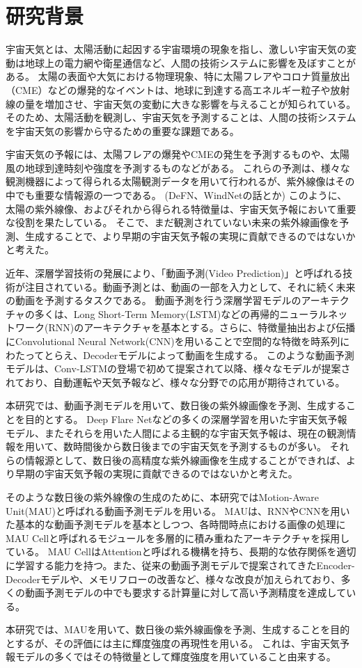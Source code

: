 \chapter{研究背景}

宇宙天気とは、太陽活動に起因する宇宙環境の現象を指し、激しい宇宙天気の変動は地球上の電力網や衛星通信など、人間の技術システムに影響を及ぼすことがある。
太陽の表面や大気における物理現象、特に太陽フレアやコロナ質量放出（CME）などの爆発的なイベントは、地球に到達する高エネルギー粒子や放射線の量を増加させ、宇宙天気の変動に大きな影響を与えることが知られている。
そのため、太陽活動を観測し、宇宙天気を予測することは、人間の技術システムを宇宙天気の影響から守るための重要な課題である。

宇宙天気の予報には、太陽フレアの爆発やCMEの発生を予測するものや、太陽風の地球到達時刻や強度を予測するものなどがある。
これらの予測は、様々な観測機器によって得られる太陽観測データを用いて行われるが、紫外線像はその中でも重要な情報源の一つである。
(DeFN、WindNetの話とか)
このように、太陽の紫外線像、およびそれから得られる特徴量は、宇宙天気予報において重要な役割を果たしている。
そこで、まだ観測されていない未来の紫外線画像を予測、生成することで、より早期の宇宙天気予報の実現に貢献できるのではないかと考えた。

近年、深層学習技術の発展により、「動画予測(Video Prediction)」と呼ばれる技術が注目されている。動画予測とは、動画の一部を入力として、それに続く未来の動画を予測するタスクである。
動画予測を行う深層学習モデルのアーキテクチャの多くは、Long Short-Term Memory(LSTM)などの再帰的ニューラルネットワーク(RNN)のアーキテクチャを基本とする。さらに、特徴量抽出および伝播にConvolutional Neural Network(CNN)を用いることで空間的な特徴を時系列にわたってとらえ、Decoderモデルによって動画を生成する。
このような動画予測モデルは、Conv-LSTMの登場で初めて提案されて以降、様々なモデルが提案されており、自動運転や天気予報など、様々な分野での応用が期待されている。

本研究では、動画予測モデルを用いて、数日後の紫外線画像を予測、生成することを目的とする。
Deep Flare Netなどの多くの深層学習を用いた宇宙天気予報モデル、またそれらを用いた人間による主観的な宇宙天気予報は、現在の観測情報を用いて、数時間後から数日後までの宇宙天気を予測するものが多い。
それらの情報源として、数日後の高精度な紫外線画像を生成することができれば、より早期の宇宙天気予報の実現に貢献できるのではないかと考えた。

そのような数日後の紫外線像の生成のために、本研究ではMotion-Aware Unit(MAU)と呼ばれる動画予測モデルを用いる。
MAUは、RNNやCNNを用いた基本的な動画予測モデルを基本としつつ、各時間時点における画像の処理にMAU Cellと呼ばれるモジュールを多層的に積み重ねたアーキテクチャを採用している。
MAU CellはAttentionと呼ばれる機構を持ち、長期的な依存関係を適切に学習する能力を持つ。また、従来の動画予測モデルで提案されてきたEncoder-Decoderモデルや、メモリフローの改善など、様々な改良が加えられており、多くの動画予測モデルの中でも要求する計算量に対して高い予測精度を達成している。

本研究では、MAUを用いて、数日後の紫外線画像を予測、生成することを目的とするが、その評価には主に輝度強度の再現性を用いる。
これは、宇宙天気予報モデルの多くではその特徴量として輝度強度を用いていること由来する。
